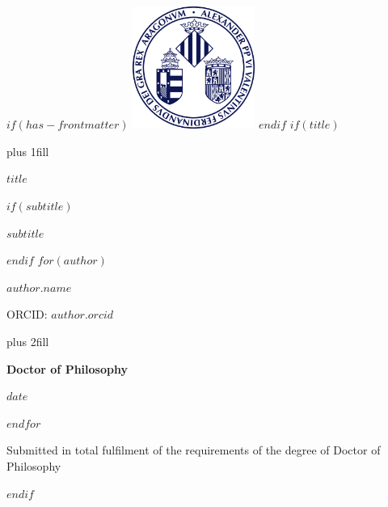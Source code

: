 $if(has-frontmatter)$
\frontmatter
\centering\includegraphics[width=0.3\textwidth]{logouni}
$endif$
$if(title)$
\cleardoublepage
\thispagestyle{empty}
{\centering
\hbox{}\vskip 0cm plus 1fill
{\Huge\bfseries $title$ \par}
$if(subtitle)$
\vspace{3ex}
{\Large\bfseries $subtitle$ \par}
$endif$
\vspace{12ex}
$for(author)$
    {\Large\bfseries $author.name$ \par}
    \vspace{3ex}
    {\Large ORCID: $author.orcid$ \par}
    \vskip 0cm plus 2fill
    {\bfseries\large Doctor of Philosophy \par}
    \vspace{3ex}
    {\bfseries\large $date$ \par}
    \vspace{12ex}
$endfor$%
\vspace{12ex}
{\small Submitted in total fulfilment of the requirements
of the degree of Doctor of Philosophy \par}
}
$endif$